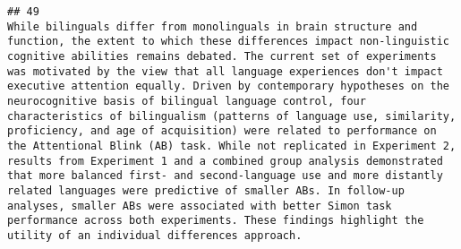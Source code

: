 \documentclass[
  english,
  man]{apa6}
\begin{document}
\begin{verbatim}
## 49                                                                                                                                                                                                                                                                                                                                                                                                                                                                                                                                                                                                                                                                                                                                                                                                                                                                                                                                                                                                                                                                                                                                                                                                                                                                                                                                                                                                                                                                                                                                                                                                                                                   While bilinguals differ from monolinguals in brain structure and function, the extent to which these differences impact non-linguistic cognitive abilities remains debated. The current set of experiments was motivated by the view that all language experiences don't impact executive attention equally. Driven by contemporary hypotheses on the neurocognitive basis of bilingual language control, four characteristics of bilingualism (patterns of language use, similarity, proficiency, and age of acquisition) were related to performance on the Attentional Blink (AB) task. While not replicated in Experiment 2, results from Experiment 1 and a combined group analysis demonstrated that more balanced first- and second-language use and more distantly related languages were predictive of smaller ABs. In follow-up analyses, smaller ABs were associated with better Simon task performance across both experiments. These findings highlight the utility of an individual differences approach.

\end{verbatim}
\end{document}
